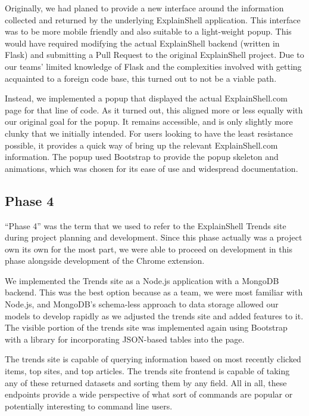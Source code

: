 \documentclass[11pt]{article}
\begin{document}
Originally, we had planed to provide a new interface around the
information collected and returned by the underlying ExplainShell application.
This interface was to be more mobile friendly and also suitable to a
light-weight popup. This would have required modifying the actual ExplainShell
backend (written in Flask) and submitting a Pull Request to the original
ExplainShell project. Due to our teams' limited knowledge of Flask and the
complexities involved with getting acquainted to a foreign code base, this
turned out to not be a viable path.

Instead, we implemented a popup that displayed the actual ExplainShell.com page
for that line of code. As it turned out, this aligned more or less equally with
our original goal for the popup. It remains accessible, and is only slightly
more clunky that we initially intended. For users looking to have the least
resistance possible, it provides a quick way of bring up the relevant
ExplainShell.com information. The popup used Bootstrap to provide the popup
skeleton and animations, which was chosen for its ease of use and widespread
documentation.

\subsection{Phase 4}

``Phase 4'' was the term that we used to refer to the ExplainShell Trends site
during project planning and development. Since this phase actually was a project
own its own for the most part, we were able to proceed on development in this
phase alongside development of the Chrome extension.

We implemented the Trends site as a Node.js application with a MongoDB backend.
This was the best option because as a team, we were most familiar with Node.js,
and MongoDB's schema-less approach to data storage allowed our models to develop
rapidly as we adjusted the trends site and added features to it. The visible
portion of the trends site was implemented again using Bootstrap with a library
for incorporating JSON-based tables into the page.

The trends site is capable of querying information based on most recently
clicked items, top sites, and top articles. The trends site frontend is capable
of taking any of these returned datasets and sorting them by any field. All in
all, these endpoints provide a wide perspective of what sort of commands are
popular or potentially interesting to command line users.
\end{document}
